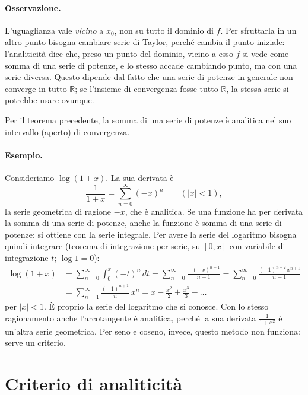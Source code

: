 \paragraph{Osservazione.}
L'uguaglianza vale \emph{vicino} a $x_0$, non su tutto il dominio di $f$. Per sfruttarla in un altro punto bisogna
cambiare serie di Taylor, perché cambia il punto iniziale: l'analiticità dice che, preso un punto del dominio,
vicino a esso $f$ si vede come somma di una serie di potenze, e lo stesso accade cambiando punto, ma con una
serie diversa.
Questo dipende dal fatto che una serie di potenze in generale non converge in tutto $\mathbb{R}$; se l'insieme
di convergenza fosse tutto $\mathbb{R}$, la stessa serie si potrebbe usare ovunque.

Per il teorema precedente, la somma di una serie di potenze è analitica nel suo intervallo (aperto) di
convergenza.

\paragraph{Esempio.}
Consideriamo $\log(1+x)$. La sua derivata è
\[
  \frac{1}{1+x} = \sum_{n=0}^{\infty} (-x)^n \qquad (|x|<1),
\]
la serie geometrica di ragione $-x$, che è analitica.
Se una funzione ha per derivata la somma di una serie di potenze, anche la funzione è somma di una serie di
potenze: si ottiene con la serie integrale.
Per avere la serie del logaritmo bisogna quindi integrare (teorema di integrazione per serie, su $[0,x]$ con
variabile di integrazione $t$; $\log 1 = 0$):
\begin{align*}
  \log(1+x)
  &= \sum_{n=0}^{\infty} \int_0^x (-t)^n\,dt
  = \sum_{n=0}^{\infty} \frac{-(-x)^{n+1}}{n+1}
  = \sum_{n=0}^{\infty} \frac{(-1)^{n+2}\,x^{n+1}}{n+1} \\
  &= \sum_{n=1}^{\infty} \frac{(-1)^{n+1}}{n}\,x^n
  = x - \frac{x^2}{2} + \frac{x^3}{3} - \dots
\end{align*}
per $|x|<1$.
È proprio la serie del logaritmo che si conosce. Con lo stesso ragionamento anche l'arcotangente è analitica,
perché la sua derivata $\frac{1}{1+x^2}$ è un'altra serie geometrica. Per seno e coseno, invece, questo metodo
non funziona: serve un criterio.

\section{Criterio di analiticità}

